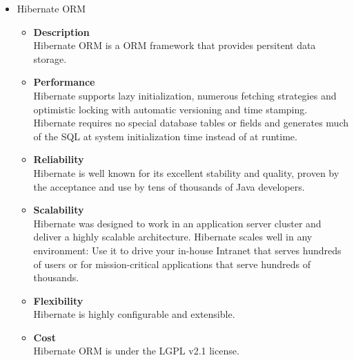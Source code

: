 \documentclass[a4paper,10pt]{article}
\begin{document}
\begin{itemize}
		\item Hibernate ORM
			\begin{itemize}
				\item \textbf{Description}\\
					Hibernate ORM is a ORM framework that provides persitent data storage.
				\item \textbf{Performance}\\
					Hibernate supports lazy initialization, numerous fetching strategies and optimistic locking with automatic versioning and time stamping. Hibernate requires no special database tables or fields and generates much of the SQL at system initialization time instead of at runtime.
				\item \textbf{Reliability}\\
					Hibernate is well known for its excellent stability and quality, proven by the acceptance and use by tens of thousands of Java developers.
				\item \textbf{Scalability}\\
					Hibernate was designed to work in an application server cluster and deliver a highly scalable architecture. Hibernate scales well in any environment: Use it to drive your in-house Intranet that serves hundreds of users or for mission-critical applications that serve hundreds of thousands.
				\item \textbf{Flexibility}\\
					Hibernate is highly configurable and extensible.			
				\item \textbf{Cost}\\
					Hibernate ORM is under the LGPL v2.1 license.
			\end{itemize}
			

\end{itemize}
\end{document}
